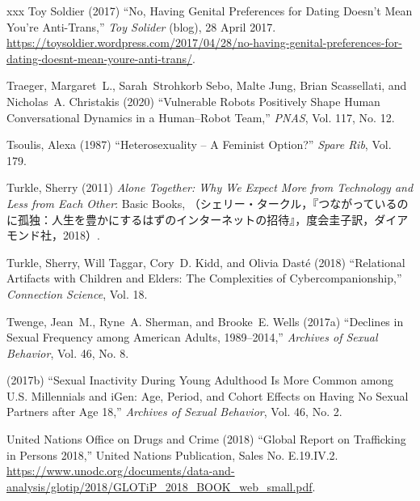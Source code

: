 \documentclass[]{jlreq} \usepackage{mystyle}
\begin{document}
\begin{thebibliography}{xxx}
{Toy Soldier} (2017) ``No, Having Genital Preferences for Dating Doesn't Mean
  You're Anti-Trans,'' \emph{Toy Solider} (blog), 28 April 2017.
  \url{https://toysoldier.wordpress.com/2017/04/28/no-having-genital-preferences-for-dating-doesnt-mean-youre-anti-trans/}.

Traeger, Margaret~L., Sarah~Strohkorb Sebo, Malte Jung, Brian Scassellati, and
  Nicholas~A. Christakis (2020) ``Vulnerable Robots Positively Shape Human
  Conversational Dynamics in a Human--Robot Team,'' \textit{ PNAS}, Vol. 117,
  No. 12.

Tsoulis, Alexa (1987) ``Heterosexuality -- A Feminist Option?'' \textit{ Spare
  Rib}, Vol. 179.

Turkle, Sherry (2011)  \textit{ Alone Together: Why We Expect More from
  Technology and Less from Each Other}: Basic Books,
  （シェリー・タークル，『つながっているのに孤独：人生を豊かにするはずのインターネットの招待』，度会圭子訳，ダイアモンド社，2018）.

Turkle, Sherry, Will Taggar, Cory~D. Kidd, and Olivia Dasté (2018)
  ``Relational Artifacts with Children and Elders: The Complexities of
  Cybercompanionship,'' \textit{ Connection Science}, Vol. 18.

Twenge, Jean~M., Ryne~A. Sherman, and Brooke~E. Wells (2017a) ``Declines in
  Sexual Frequency among American Adults, 1989--2014,'' \textit{ Archives of
  Sexual Behavior}, Vol. 46, No. 8.

 \bysame{}  (2017b) ``Sexual Inactivity During Young Adulthood Is More Common
  among U.S. Millennials and iGen: Age, Period, and Cohort Effects on Having No
  Sexual Partners after Age 18,'' \textit{ Archives of Sexual Behavior}, Vol.
  46, No. 2.

{United Nations Office on Drugs and Crime} (2018) ``Global Report on
  Trafficking in Persons 2018,'' United Nations Publication, Sales No.
  E.19.IV.2.
  \url{https://www.unodc.org/documents/data-and-analysis/glotip/2018/GLOTiP_2018_BOOK_web_small.pdf}.


\end{thebibliography}
\end{document}
